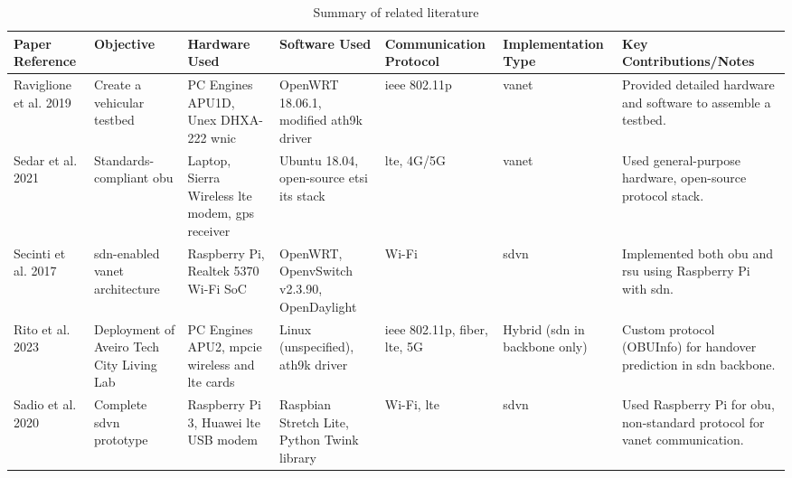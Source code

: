 \begin{table}[!htb]
	\centering
	\begin{tabular}{|p{1.5cm}|p{1.7cm}|p{2cm}|p{1.6cm}|p{1.6cm}|p{1.8cm}|p{2.5cm}|}
	\hline
	\textbf{Paper Reference} & \textbf{Objective} & \textbf{Hardware Used} & \textbf{Software Used} & \textbf{Commu\-nication Protocol} & \textbf{Imple\-mentation Type} & \textbf{Key Contributions/Notes} \\ \hline
	
	Raviglione et al. 2019~\cite{raviglione_open_2019} & Create a vehicular testbed & PC Engines APU1D, Unex DHXA-222 \gls{wnic} & OpenWRT 18.06.1, modified ath9k driver & \gls{ieee} 802.11p & \gls{vanet} & Provided detailed hardware and software to assemble a testbed. \\ \hline
	
	Sedar et al. 2021~\cite{sedar_standards-compliant_2021} & Standards-compliant \gls{obu} & Laptop, Sierra Wireless \gls{lte} modem, \gls{gps} receiver & Ubuntu 18.04, open-source \gls{etsi} \gls{its} stack & \gls{lte}, 4G/5G & \gls{vanet} & Used general-purpose hardware, open-source protocol stack. \\ \hline
	
	Secinti et al. 2017~\cite{secinti_software_2017} & \gls{sdn}-enabled \gls{vanet} architecture & Raspberry Pi, Realtek 5370 Wi-Fi SoC & OpenWRT, OpenvSwitch v2.3.90, OpenDaylight & Wi-Fi & \gls{sdvn} & Implemented both \gls{obu} and \gls{rsu} using Raspberry Pi with \gls{sdn}. \\ \hline
	
	Rito et al. 2023~\cite{rito_aveiro_2023} & Deployment of Aveiro Tech City Living Lab & PC Engines APU2, \gls{mpcie} wireless and \gls{lte} cards & Linux (unspecified), ath9k driver & \gls{ieee} 802.11p, fiber, \gls{lte}, 5G & Hybrid (\gls{sdn} in backbone only) & Custom protocol (OBUInfo) for handover prediction in \gls{sdn} backbone. \\ \hline
	
	Sadio et al. 2020~\cite{sadio_design_2020} & Complete \gls{sdvn} prototype & Raspberry Pi 3, Huawei \gls{lte} USB modem & Raspbian Stretch Lite, Python Twink library & Wi-Fi, \gls{lte} & \gls{sdvn} & Used Raspberry Pi for \gls{obu}, non-standard protocol for \gls{vanet} communication. \\ \hline
	
	\end{tabular}
	\caption{Summary of related literature}
	\label{table:related}
\end{table}
	
